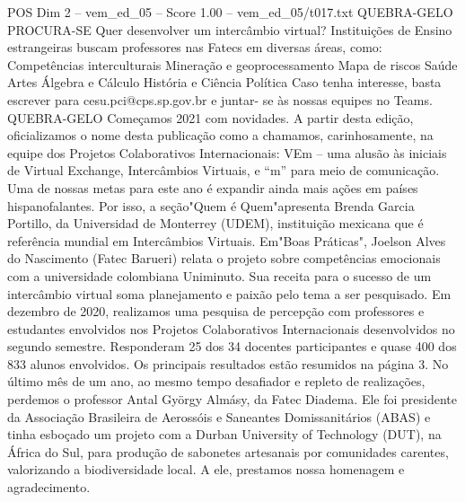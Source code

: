 \begin{textsample}{POS Dim 2 – vem\_ed\_05 – Score 1.00 – vem\_ed\_05/t017.txt}  \label{ex:f2_pos_093}
QUEBRA-GELO PROCURA-SE Quer desenvolver um intercâmbio virtual?
Instituições de Ensino estrangeiras buscam professores nas Fatecs em diversas áreas, como: Competências interculturais Mineração e geoprocessamento Mapa de riscos Saúde Artes Álgebra e Cálculo História e Ciência Política Caso tenha interesse, basta escrever para cesu.pci@cps.sp.gov.br e juntar- se às nossas equipes no Teams.
QUEBRA-GELO Começamos 2021 com novidades.
A partir desta edição, oficializamos o nome desta publicação como a chamamos, carinhosamente, na equipe dos Projetos Colaborativos Internacionais: VEm – uma alusão às iniciais de Virtual Exchange, Intercâmbios Virtuais, e “m” para meio de comunicação.
Uma de nossas metas para este ano é expandir ainda mais ações em países hispanofalantes.
Por isso, a seção"Quem é Quem"apresenta Brenda Garcia Portillo, da Universidad de Monterrey (UDEM), instituição mexicana que é referência mundial em Intercâmbios Virtuais.
Em"Boas Práticas", Joelson Alves do Nascimento (Fatec Barueri) relata o projeto sobre competências emocionais com a universidade colombiana Uniminuto.
Sua receita para o sucesso de um intercâmbio virtual soma planejamento e paixão pelo tema a ser pesquisado.
Em dezembro de 2020, realizamos uma pesquisa de percepção com professores e estudantes envolvidos nos Projetos Colaborativos Internacionais desenvolvidos no segundo semestre.
Responderam 25 dos 34 docentes participantes e quase 400 dos 833 alunos envolvidos.
Os principais resultados estão resumidos na página 3.
No último mês de um ano, ao mesmo tempo desafiador e repleto de realizações, perdemos o professor Antal György Almásy, da Fatec Diadema.
Ele foi presidente da Associação Brasileira de Aerossóis e Saneantes Domissanitários (ABAS) e tinha esboçado um projeto com a Durban University of Technology (DUT), na África do Sul, para produção de sabonetes artesanais por comunidades carentes, valorizando a biodiversidade local.
A ele, prestamos nossa homenagem e agradecimento.

\end{textsample}
